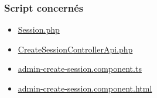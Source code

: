 \vspace{\baselineskip}
\subsubsection{Script concernés}
	\begin{itemize}
		\item \href{https://github.com/victorsmits/Aquabike/blob/master/backend/src/Entity/Session.php}{Session.php}
		\item \href{https://github.com/victorsmits/Aquabike/blob/master/backend/src/Controller/API/CreateSessionControllerApi.php}{CreateSessionControllerApi.php}
		\item \href{https://github.com/victorsmits/Aquabike/blob/master/frontend/src/app/admin-create-session/admin-create-session.component.ts}{admin-create-session.component.ts}
		\item \href{https://github.com/victorsmits/Aquabike/blob/master/frontend/src/app/admin-create-session/admin-create-session.component.html}{admin-create-session.component.html}
	\end{itemize}